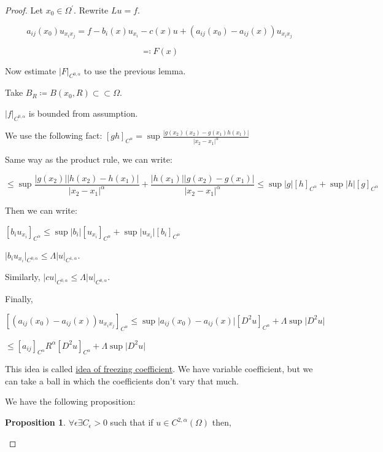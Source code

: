 \documentclass{article}
\theoremstyle{definition}
\newtheorem{proposition}{Proposition}
\begin{document}
\begin{proof}
    Let \(x_0 \in \Omega ^{\prime} \). Rewrite \(Lu = f\).

    \[
        a_{ij} (x_0) u_{x_i x_j} = f - b_i(x) u_{x_i} - c(x) u + (a_{ij}(x_0) -a_{ij}(x))u_{x_i x_j}
    \]

    \[
        \eqqcolon F(x)
    \]

    Now estimate \(\vert F \vert_{C^{0,\alpha}}\) to use the previous lemma.

    Take \(B_R \coloneqq B(x_0,R) \subset \subset \Omega\).

    \(\vert f \vert_{C^{0,\alpha}}\) is bounded from assumption.

    We use the following fact: \([gh]_{C^\alpha} = \sup \frac{\vert g(x_2)(x_2) - g(x_1)h(x_1) \vert}{\vert x_2 - x_1 \vert^\alpha} \) 

    Same way as the product rule, we can write:

    \[
        \leq \sup \frac{\vert g(x_2) \vert \vert h(x_2) - h(x_1) \vert}{\vert x_2 - x_1 \vert ^ \alpha}+\frac{\vert h(x_1) \vert \vert g(x_2)-g(x_1) \vert}{\vert x_2 - x_1 \vert ^\alpha} \leq \sup \vert g \vert [h]_{C^\alpha} + \sup \vert h \vert [g]_{C^\alpha}
    \]

    Then we can write:

    \([b_i u_{x_i}]_{C^\alpha} \leq \sup \vert b_i \vert [u_{x_i}]_{C^\alpha} + \sup \vert u_{x_i} \vert [b_i]_{C^\alpha}\) 

    \(\vert b_i u_{x_i} \vert_{C^{0,\alpha}} \leq \Lambda \vert u \vert_{C^{1,\alpha}}\).

    Similarly, \(\vert cu \vert_{C^{0,\alpha}} \leq \Lambda \vert u \vert_{C^{0,\alpha}}\).

    Finally,

    \([(a_{ij}(x_0) - a_{ij}(x))u_{x_i x_j} ]_{C^\alpha} \leq \sup \vert a_{ij}(x_0) -a_{ij} (x) \vert [D^2 u]_{C^\alpha} + \Lambda \sup \vert D^2 u \vert\)
    
    \(\leq [a_{ij}]_{C^\alpha} R^\alpha [D^2 u]_{C^\alpha} + \Lambda \sup \vert D^2 u \vert\) 

    This idea is called \underline{idea of freezing coefficient}. We have variable coefficient, but we can take a ball in which the coefficients don't vary that much.

    We have the following proposition:

    \begin{proposition}
        \(\forall \epsilon \exists C_{\epsilon} > 0\) such that if \(u\in C^{2,\alpha}(\Omega)\) then,


\end{proposition}
\end{proof}
\end{document}
